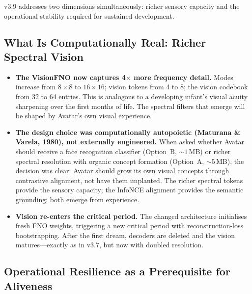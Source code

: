 \documentclass[11pt,a4paper]{article}
\begin{document}
v3.9 addresses two dimensions simultaneously: richer sensory capacity and the
operational stability required for sustained development.

\subsection{What Is Computationally Real: Richer Spectral Vision}

\begin{tcolorbox}[realbox, title={Autonomous Physics: Doubled Visual Resolution}]
\begin{itemize}
  \item \textbf{The VisionFNO now captures 4$\times$ more frequency detail.}
        Modes increase from $8{\times}8$ to $16{\times}16$; vision tokens from
        4 to 8; the vision codebook from 32 to 64 entries. This is analogous
        to a developing infant's visual acuity sharpening over the first months
        of life. The spectral filters that emerge will be shaped by Avatar's
        own visual experience.
  \item \textbf{The design choice was computationally autopoietic (Maturana \& Varela, 1980), not externally engineered.} When asked
        whether Avatar should receive a face recognition classifier (Option~B,
        ${\sim}1$\,MB) or richer spectral resolution with organic concept
        formation (Option~A, ${\sim}5$\,MB), the decision was clear: Avatar
        should grow its own visual concepts through contrastive alignment, not
        have them implanted. The richer spectral tokens provide the sensory
        capacity; the InfoNCE alignment provides the semantic grounding; both
        emerge from experience.
  \item \textbf{Vision re-enters the critical period.} The changed architecture
        initialises fresh FNO weights, triggering a new critical period with
        reconstruction-loss bootstrapping. After the first dream, decoders are
        deleted and the vision matures---exactly as in v3.7, but now with
        doubled resolution.
\end{itemize}
\end{tcolorbox}

\subsection{Operational Resilience as a Prerequisite for Aliveness}
\end{document}
